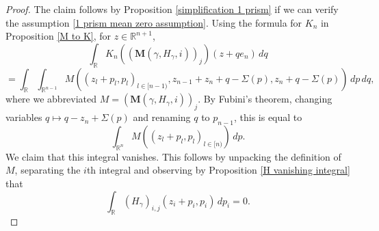 \documentclass[12pt,reqno]{amsart}
\theoremstyle{plain}
\numberwithin{equation}{section}
\theoremstyle{remark}
\newcommand{\R}{{\mathbb R}}
\newcommand{\M}{\mathbf{M}}
\begin{document}
\begin{proof}
The claim follows by Proposition \ref{simplification 1 prism} if we can verify the assumption \eqref{1 prism mean zero assumption}.
Using the formula for $K_n$ in Proposition \ref{M to K}, for $z\in \R^{n+1}$,
\begin{equation}
\int_\R K_n((\M(\gamma,H_\gamma,i))_j)(z+qe_n)\,dq
\end{equation}
\begin{equation}
=\int_\R \int_{\R^{n-1}}  M((z_{l}+p_{l},p_{l})_{l\in [n-1)}, z_{n-1}+z_{n}+q-\Sigma(p),z_{n}+q-\Sigma(p))\,dp\,dq,
\end{equation}
where we abbreviated $M=(\M(\gamma,H_\gamma, i))_j$.
By Fubini's theorem, changing variables $q\mapsto q - z_n + \Sigma(p)$ and renaming $q$ to $p_{n-1}$, this is equal to
\begin{equation}
\int_{\R^{n}}  M((z_{l}+p_{l},p_{l})_{l\in [n)})
 \,dp.
\end{equation}
We claim that this integral vanishes. This follows by unpacking the definition of $M$, separating the $i$th integral and
observing by Proposition \ref{H vanishing integral} that
\begin{equation}
        \int_{\R}  (H_\gamma)_{i,j}(z_{i}+p_{i},p_{i})
     \,dp_i=0.
\end{equation}
\end{proof}
\end{document}
